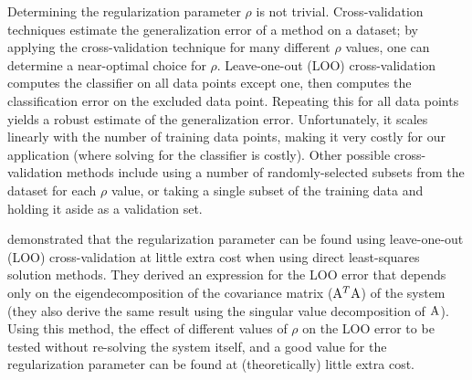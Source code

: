Determining the regularization parameter $\rho$ is not trivial.
Cross-validation techniques estimate the generalization error of a method on a dataset;
by applying the cross-validation technique for many different $\rho$ values,
one can determine a near-optimal choice for $\rho$.
Leave-one-out (LOO) cross-validation computes the classifier on all data points
except one, then computes the classification error on the excluded data point.
Repeating this for all data points yields a robust estimate of the generalization error.
Unfortunately, it scales linearly with the number of training data points,
making it very costly for our application (where solving for the classifier is costly).
Other possible cross-validation methods include using a number of randomly-selected
subsets from the dataset for each $\rho$ value,
or taking a single subset of the training data and holding it aside as a validation set.

\textcite{Rifkin2007} demonstrated that the regularization parameter
can be found using leave-one-out (LOO) cross-validation
at little extra cost when using direct least-squares solution methods.
They derived an expression for the LOO error
that depends only on the eigendecomposition of
the covariance matrix ($\mathrm{A}^T \mathrm{A}$) of the system
(they also derive the same result using the singular value decomposition of $\mathrm{A}$).
Using this method, the effect of different values of $\rho$ on the LOO error
to be tested without re-solving the system itself,
and a good value for the regularization parameter
can be found at (theoretically) little extra cost.


